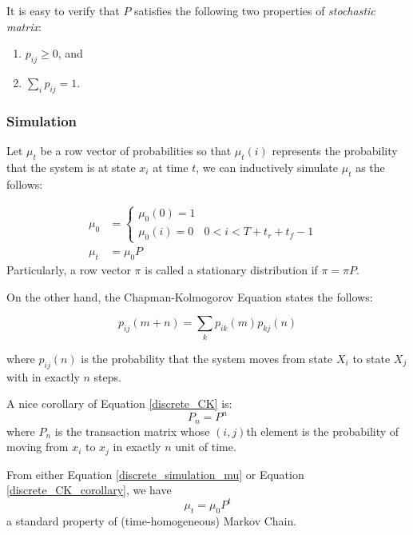 It is easy to verify that $P$ satisfies the following two properties of {\it stochastic matrix}:
\begin{enumerate}
\item $p_{ij} \ge 0$, and
\item $\sum \limits_{i} p_{ij} = 1$.
\end{enumerate}



\subsubsection{Simulation}
\label{discrete_simulation}

Let $\mu_t$ be a row vector of probabilities so that $\mu_t(i)$ represents the 
probability that the system is at state $x_i$ at time $t$, we can inductively 
simulate $\mu_t$ as the follows:

\begin{subequations}
\label{discrete_simulation_mu}
\begin{align}
\mu_0 & =  \begin{cases}  \mu_0(0) = 1 & \\
    \mu_0(i) = 0 & 0 < i < T+t_r+t_f -1
\end{cases}  \label{mu_0}\\
\mu_t & = \mu_0 P  &  \label{mu_t}
\end{align}
\end{subequations}
Particularly, a row vector $\pi$ is called a stationary distribution if $\pi = 
\pi P$.

On the other hand, the Chapman-Kolmogorov Equation states the follows:

\begin{equation}
\label{discrete_CK}
p_{ij}(m+n) = \sum \limits_k p_{ik}(m)p_{kj}(n)
\end{equation}

where $p_{ij}(n)$ is the probability that the system moves from state $X_i$
to state $X_j$ with in exactly $n$ steps.  

A nice corollary of Equation \ref{discrete_CK} is:
\begin{equation}
\label{discrete_CK_corollary}
P_n = P^n
\end{equation}
where $P_n$ is the transaction matrix whose $(i,j)$th element is the probability 
of moving from $x_i$ to $x_j$ in exactly $n$ unit of time.

From either Equation \ref{discrete_simulation_mu} or Equation 
\ref{discrete_CK_corollary}, we have
\begin{equation}
\label{discrete_CK_corollary}
\mu_t = \mu_0 P^t
\end{equation}
a standard property of (time-homogeneous) Markov Chain.



